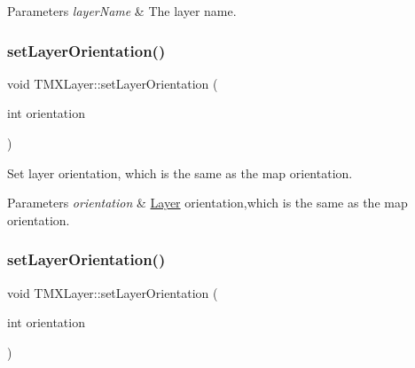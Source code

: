 \begin{DoxyParams}{Parameters}
{\em layer\+Name} & The layer name. \\
\hline
\end{DoxyParams}
\mbox{\label{classTMXLayer_a0de2d7f74cf0563ab0c6f9f0de28c3aa}} 
\subsubsection{\texorpdfstring{set\+Layer\+Orientation()}{setLayerOrientation()}\hspace{0.1cm}{\footnotesize\ttfamily [1/2]}}
{\footnotesize\ttfamily void T\+M\+X\+Layer\+::set\+Layer\+Orientation (\begin{DoxyParamCaption}\item[{int}]{orientation }\end{DoxyParamCaption})\hspace{0.3cm}{\ttfamily [inline]}}

Set layer orientation, which is the same as the map orientation.


\begin{DoxyParams}{Parameters}
{\em orientation} & \hyperlink{classLayer}{Layer} orientation,which is the same as the map orientation. \\
\hline
\end{DoxyParams}
\mbox{\label{classTMXLayer_a0de2d7f74cf0563ab0c6f9f0de28c3aa}} 
\subsubsection{\texorpdfstring{set\+Layer\+Orientation()}{setLayerOrientation()}\hspace{0.1cm}{\footnotesize\ttfamily [2/2]}}
{\footnotesize\ttfamily void T\+M\+X\+Layer\+::set\+Layer\+Orientation (\begin{DoxyParamCaption}\item[{int}]{orientation }\end{DoxyParamCaption})\hspace{0.3cm}{\ttfamily [inline]}}

